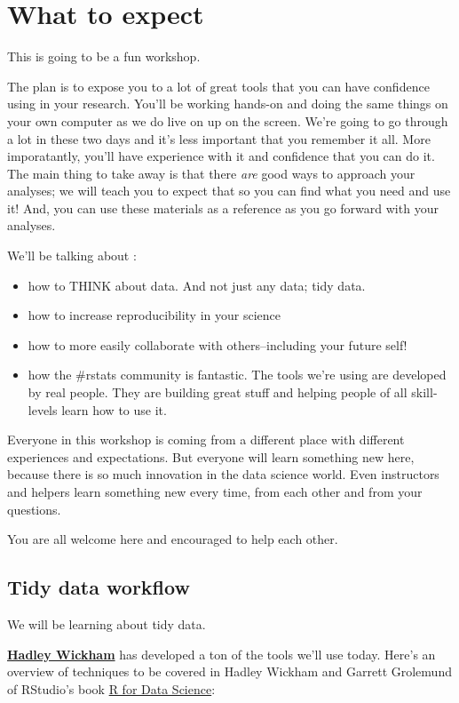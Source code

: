 \documentclass[]{book}
\providecommand{\tightlist}{%
  \setlength{\itemsep}{0pt}\setlength{\parskip}{0pt}}
\theoremstyle{definition}
\theoremstyle{definition}
\theoremstyle{definition}
\theoremstyle{remark}
\begin{document}
\section{What to expect}\label{what-to-expect}

This is going to be a fun workshop.

The plan is to expose you to a lot of great tools that you can have
confidence using in your research. You'll be working hands-on and doing
the same things on your own computer as we do live on up on the screen.
We're going to go through a lot in these two days and it's less
important that you remember it all. More imporatantly, you'll have
experience with it and confidence that you can do it. The main thing to
take away is that there \emph{are} good ways to approach your analyses;
we will teach you to expect that so you can find what you need and use
it! And, you can use these materials as a reference as you go forward
with your analyses.

We'll be talking about :

\begin{itemize}
\tightlist
\item
  how to THINK about data. And not just any data; tidy data.
\item
  how to increase reproducibility in your science
\item
  how to more easily collaborate with others--including your future
  self!
\item
  how the \#rstats community is fantastic. The tools we're using are
  developed by real people. They are building great stuff and helping
  people of all skill-levels learn how to use it.
\end{itemize}

Everyone in this workshop is coming from a different place with
different experiences and expectations. But everyone will learn
something new here, because there is so much innovation in the data
science world. Even instructors and helpers learn something new every
time, from each other and from your questions.

You are all welcome here and encouraged to help each other.

\subsection{Tidy data workflow}\label{tidy-data-workflow}

We will be learning about tidy data.

\href{http://hadley.nz/}{\textbf{Hadley Wickham}} has developed a ton of
the tools we'll use today. Here's an overview of techniques to be
covered in Hadley Wickham and Garrett Grolemund of RStudio's book
\href{http://r4ds.had.co.nz/}{R for Data Science}:
\end{document}
